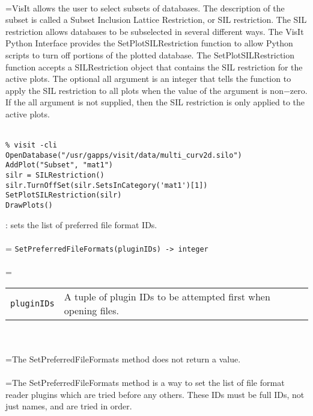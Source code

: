 \documentclass[10pt,a4paper]{report}
\begin{document}
 \\ 
\hangindent=\parindent VisIt allows the user to select subsets of databases. The description of the subset is called a Subset Inclusion Lattice Restriction, or SIL restriction. The SIL restriction allows databases to be subselected in several different ways. The VisIt Python Interface provides the SetPlotSILRestriction function to allow Python scripts to turn off portions of the plotted database. The SetPlotSILRestriction function accepts a SILRestriction object that contains the SIL restriction for the active plots. The optional all argument is an integer that tells the function to apply the SIL restriction to all plots when the value of the argument is non$-$zero. If the all argument is not supplied, then the SIL restriction is only applied to the active plots. \\[-3mm] 

\\[-6mm]
\begin{verbatim}% visit -cli
OpenDatabase("/usr/gapps/visit/data/multi_curv2d.silo")
AddPlot("Subset", "mat1")
silr = SILRestriction()
silr.TurnOffSet(silr.SetsInCategory('mat1')[1])
SetPlotSILRestriction(silr)
DrawPlots()
\end{verbatim}
\newpage


{}
: sets the list of preferred file format IDs.\\[-3mm]

 \\ 
\hangindent=\parindent 
\verb!SetPreferredFileFormats(pluginIDs) -> integer!\\ [-3mm]

 \\ 
\hangindent=\parindent 
\begin{tabular}{lp{9cm}}
\verb!pluginIDs! & A tuple of plugin IDs to be attempted first when opening files. \\
\end{tabular} \\[-2mm]


 \\ 
\hangindent=\parindent The SetPreferredFileFormats method does not return a value. \\[-3mm] 

 \\ 
\hangindent=\parindent The SetPreferredFileFormats method is a way to set the list of file format reader plugins which are tried before any others. These IDs must be full IDs, not just names, and are tried in order. \\[-3mm] 
\end{document}
